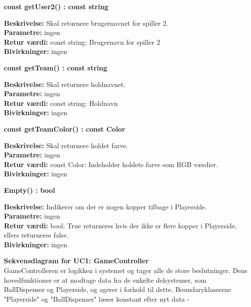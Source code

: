 \documentclass[Arkitektur/System_main.tex]{subfiles}
\begin{document}
\textbf{const getUser2() : const string}
\begin{adjustwidth}{1cm}{0pt}
\textbf{Beskrivelse:} Skal returnere brugernavnet for spiller 2.\\
\textbf{Parametre:} ingen \\[0.2cm]
\textbf{Retur værdi:} const string: Brugernavn for spiller 2\\[0.2cm]
\textbf{Bivirkninger:} ingen \\[0.2cm]
\end{adjustwidth}

\textbf{const getTeam() : const string}
\begin{adjustwidth}{1cm}{0pt}
\textbf{Beskrivelse:} Skal returnere holdnavnet.\\
\textbf{Parametre:} ingen \\[0.2cm]
\textbf{Retur værdi:} const string: Holdnavn\\[0.2cm]
\textbf{Bivirkninger:} ingen \\[0.2cm]
\end{adjustwidth}

\textbf{const getTeamColor() : const Color}
\begin{adjustwidth}{1cm}{0pt}
\textbf{Beskrivelse:} Skal returnere holdet farve.\\
\textbf{Parametre:} ingen \\[0.2cm]
\textbf{Retur værdi:} const Color: Indeholder holdets farve som RGB værdier.\\[0.2cm]
\textbf{Bivirkninger:} ingen \\[0.2cm]
\end{adjustwidth}

\textbf{Empty() : bool}
\begin{adjustwidth}{1cm}{0pt}
\textbf{Beskrivelse:} Indikerer om der er nogen kopper tilbage i Playerside.\\
\textbf{Parametre:} ingen \\[0.2cm]
\textbf{Retur værdi:} bool: True returneres hvis der ikke er flere kopper i Playerside, ellers returneres false.\\[0.2cm]
\textbf{Bivirkninger:} ingen \\[0.2cm]
\end{adjustwidth}

\textbf{Sekvensdiagram for UC1: GameController}\\
GameControlleren er logikken i systemet og tager alle de store beslutninger. Dens hovedfunktioner er at modtage data fra de enkelte delsystemer, som BallDispenser og Playerside, og agerer i forhold til dette. Boundaryklasserne "Playerside" og "BallDispenser" læser konstant efter nyt data - 
\end{document}
